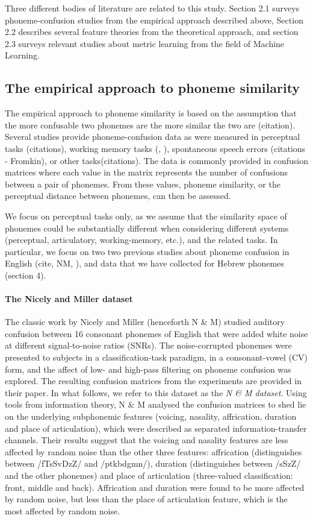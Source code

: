 Three different bodies of literature are related to this study. Section 2.1 surveys phoneme-confusion studies from the empirical approach described above, Section 2.2 describes several feature theories from the theoretical approach, and section 2.3 surveys relevant studies about metric learning from the field of Machine Learning. 

\subsection{The empirical approach to phoneme similarity}
The empirical approach to phoneme similarity is based on the assumption that the more confusable two phonemes are the more similar the two are (citation). Several studies provide phoneme-confusion data as were measured in perceptual tasks (citations), working memory tasks (\cite{Wickelgren}, \cite{Wickelgren1965}), spontaneous speech errors (citations - Fromkin), or other tasks(citations). The data is commonly provided in confusion matrices where each value in the matrix represents the number of confusions between a pair of phonemes. From these values, phoneme similarity, or the perceptual distance between phonemes, can then be assessed.

We focus on perceptual tasks only, as we assume that the similarity space of phonemes could be substantially different when considering different systems (perceptual, articulatory, working-memory, etc.), and the related tasks. In particular, we focus on two two previous studies about phoneme confusion in English (cite, NM, \cite{Luce1987}), and data that we have collected for Hebrew phonemes (section 4).

\paragraph{The Nicely and Miller dataset} The classic work by Nicely and Miller (henceforth N \& M) studied auditory confusion between 16 consonant phonemes of English that were added white noise at different signal-to-noise ratios (SNRs). The noise-corrupted phonemes were presented to subjects in a classification-task paradigm, in a consonant-vowel (CV) form, and the affect of low- and high-pass filtering on phoneme confusion was explored. The resulting confusion matrices from the experiments are provided in their paper. In what follows, we refer to this dataset as the \textit{N \& M dataset}. Using tools from information theory, N \& M analysed the confusion matrices to shed lie on the underlying subphonemic features (voicing, nasality, affrication, duration and place of articulation), which were described as separated information-transfer channels. Their results suggest that the voicing and nasality features are less affected by random noise than the other three features: affrication (distinguishes between /fTsSvDzZ/ and /ptkbdgmn/), duration (distinguishes between /sSzZ/ and the other phonemes) and place of articulation (three-valued classification: front, middle and back). Affrication and duration were found to be more affected by random noise, but less than the place of articulation feature, which is the most affected by random noise. 


